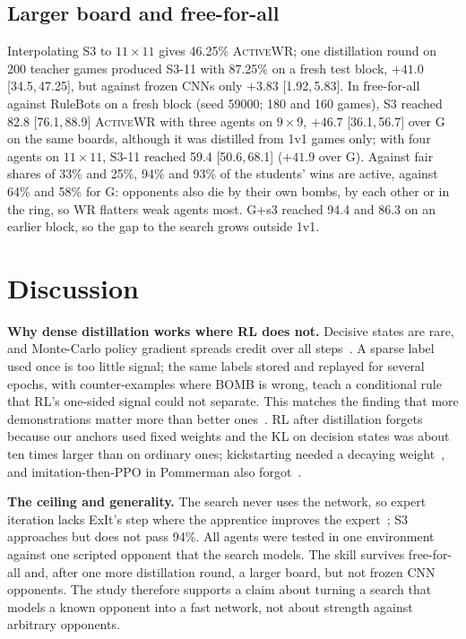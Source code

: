 \documentclass[runningheads]{llncs}
\newcommand{\awr}{\textsc{ActiveWR}}
\newcommand{\ci}[2]{[#1,\,#2]}
\begin{document}
\subsection{Larger board and free-for-all}
\label{sec:ffa}
Interpolating S3 to $11\times11$ gives 46.25\% \awr{}; one distillation round on 200 teacher games produced S3-11 with 87.25\% on a fresh test block, $+41.0$ \ci{34.5}{47.25}, but against frozen CNNs only $+3.83$ \ci{1.92}{5.83}. In free-for-all against RuleBots on a fresh block (seed 59000; 180 and 160 games), S3 reached 82.8 \ci{76.1}{88.9} \awr{} with three agents on $9\times9$, $+46.7$ \ci{36.1}{56.7} over G on the same boards, although it was distilled from 1v1 games only; with four agents on $11\times11$, S3-11 reached 59.4 \ci{50.6}{68.1} ($+41.9$ over G). Against fair shares of 33\% and 25\%, 94\% and 93\% of the students' wins are active, against 64\% and 58\% for G: opponents also die by their own bombs, by each other or in the ring, so WR flatters weak agents most. G+s3 reached 94.4 and 86.3 on an earlier block, so the gap to the search grows outside 1v1.

\section{Discussion}

\textbf{Why dense distillation works where RL does not.} Decisive states are rare, and Monte-Carlo policy gradient spreads credit over all steps~\cite{williams1992reinforce}. A sparse label used once is too little signal; the same labels stored and replayed for several epochs, with counter-examples where BOMB is wrong, teach a conditional rule that RL's one-sided signal could not separate. This matches the finding that more demonstrations matter more than better ones~\cite{kartal2019safer}. RL after distillation forgets because our anchors used fixed weights and the KL on decision states was about ten times larger than on ordinary ones; kickstarting needed a decaying weight~\cite{schmitt2018kickstart}, and imitation-then-PPO in Pommerman also forgot~\cite{meisheri2019}.

\textbf{The ceiling and generality.} The search never uses the network, so expert iteration lacks ExIt's step where the apprentice improves the expert~\cite{anthony2017exit}; S3 approaches but does not pass 94\%. All agents were tested in one environment against one scripted opponent that the search models. The skill survives free-for-all and, after one more distillation round, a larger board, but not frozen CNN opponents. The study therefore supports a claim about turning a search that models a known opponent into a fast network, not about strength against arbitrary opponents.
\end{document}
